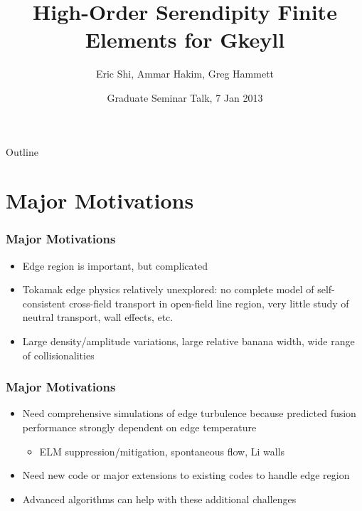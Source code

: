 \documentclass[serif,12pt]{beamer}
\title[High-Order Serendipity Elements]{High-Order Serendipity Finite Elements for Gkeyll}
\author[Eric Shi]{Eric Shi, Ammar Hakim, Greg Hammett}
\date[Graduate Seminar Talk]{Graduate Seminar Talk, 7 Jan 2013}
\begin{document}
\begin{frame}
  \titlepage
\end{frame}

\begin{frame}{Outline}
  \tableofcontents
\end{frame}

\section{Major Motivations}
\begin{frame}
\frametitle{Major Motivations}
	\begin{itemize}
		\item Edge region is important, but complicated
		\item Tokamak edge physics relatively unexplored: no complete model
	    of self-consistent cross-field transport in open-field line
	    region, very little study of neutral transport, wall effects, etc.
	    \item Large density/amplitude variations, large relative banana
	    width, wide range of collisionalities
	\end{itemize}
\end{frame}

\begin{frame}
\frametitle{Major Motivations}
	\begin{itemize}
		\item Need comprehensive simulations of edge turbulence because predicted fusion performance strongly dependent on edge temperature
		\begin{itemize}
			\item ELM suppression/mitigation, spontaneous flow, Li walls
		\end{itemize}
		\item Need new code or major extensions to existing codes to handle edge region
		\item Advanced algorithms can help with these additional challenges
	\end{itemize}
\end{frame}
\end{document}
